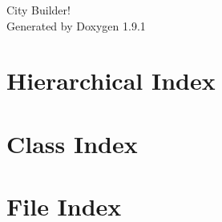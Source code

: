 \let\mypdfximage\pdfximage\def\pdfximage{\immediate\mypdfximage}\documentclass[twoside]{book}
\newcommand{\+}{\discretionary{\mbox{\scriptsize$\hookleftarrow$}}{}{}}
\newcommand{\clearemptydoublepage}{%
  \newpage{\pagestyle{empty}\cleardoublepage}%
}
\begin{document}
\raggedbottom

\hypersetup{pageanchor=false,
             bookmarksnumbered=true,
             pdfencoding=unicode
            }
\begin{titlepage}
\vspace*{7cm}
\begin{center}%
{\Large City Builder! }\\
\vspace*{1cm}
{\large Generated by Doxygen 1.9.1}\\
\end{center}
\end{titlepage}
\clearemptydoublepage
{}
\tableofcontents
\clearemptydoublepage
{}
\hypersetup{pageanchor=true}

\chapter{Hierarchical Index}

\chapter{Class Index}

\chapter{File Index}

\end{document}
